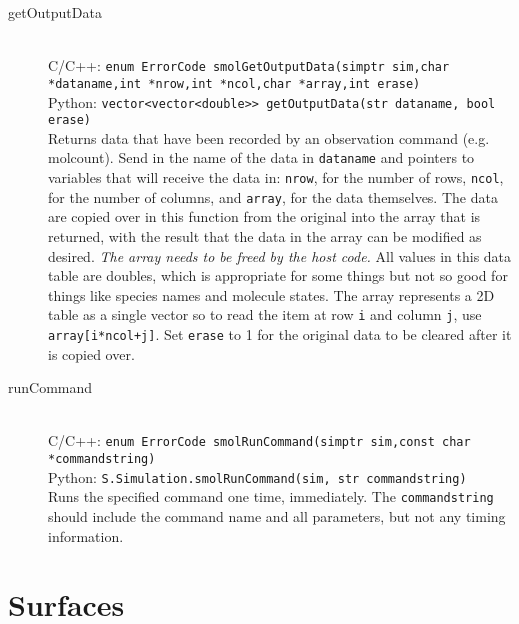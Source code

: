 \documentclass {scrbook}
\newcommand {\ttt} {\texttt}
\begin{document}
\begin{description}
\item[getOutputData]
\hfill \\
C/C++: \ttt{enum ErrorCode smolGetOutputData(simptr sim,char *dataname,int *nrow,int *ncol,char *array,int erase)}\\
Python: \ttt{vector<vector<double>> getOutputData(str dataname, bool erase)}\\
Returns data that have been recorded by an observation command (e.g. molcount). Send in the name of the data in \ttt{dataname} and pointers to variables that will receive the data in: \ttt{nrow}, for the number of rows, \ttt{ncol}, for the number of columns, and \ttt{array}, for the data themselves. The data are copied over in this function from the original into the array that is returned, with the result that the data in the array can be modified as desired. \textit{The array needs to be freed by the host code.} All values in this data table are doubles, which is appropriate for some things but not so good for things like species names and molecule states. The array represents a 2D table as a single vector so to read the item at row \ttt{i} and column \ttt{j}, use \ttt{array[i*ncol+j]}. Set \ttt{erase} to 1 for the original data to be cleared after it is copied over.

\item[runCommand]
\hfill \\
C/C++: \ttt{enum ErrorCode smolRunCommand(simptr sim,const char *commandstring)}\\
Python: \ttt{S.Simulation.smolRunCommand(sim, str commandstring)}\\
Runs the specified command one time, immediately. The \ttt{commandstring} should include the command name and all parameters, but not any timing information.

\end{description}


\section{Surfaces}
\end{document}
